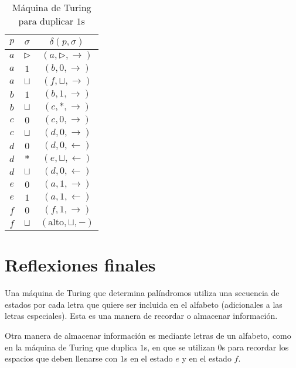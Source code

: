 \documentclass[paper=leter, fontsize=11pt]{scrartcl}
\numberwithin{equation}{section}		%
\numberwithin{figure}{section}			%
\numberwithin{table}{section}				%
\begin{document}
\begin{table}[]
	\caption{Máquina de Turing para duplicar $1$s}
	\label{duplicar}
	\centering
	\begin{tabular}{cc|c}
	$p$ & $\sigma$ & $\delta(p, \sigma)$ \\ \hline

	$a$ & $\triangleright$ & $(a, \triangleright, \rightarrow)$ \\
	$a$ & $1$ & $(b, 0, \rightarrow)$ \\
	$a$ & $\sqcup$ & $(f, \sqcup, \rightarrow)$ \\
	$b$ & $1$ & $(b, 1, \rightarrow)$ \\
	$b$ & $\sqcup$ & $(c, *, \rightarrow)$ \\
	$c$ & $0$ & $(c, 0, \rightarrow)$ \\
	$c$ & $\sqcup$ & $(d, 0, \rightarrow)$ \\
	$d$ & $0$ & $(d, 0, \leftarrow)$ \\
	$d$ & $*$ & $(e, \sqcup, \leftarrow)$ \\
	$d$ & $\sqcup$ & $(d, 0, \leftarrow)$ \\
	$e$ & $0$ & $(a, 1, \rightarrow)$ \\
	$e$ & $1$ & $(a, 1, \leftarrow)$ \\
	$f$ & $0$ & $(f, 1, \rightarrow)$ \\
	$f$ & $\sqcup$ & $(\text{alto}, \sqcup, -)$
	\end{tabular}
\end{table}

\section{Reflexiones finales}
Una máquina de Turing que determina palíndromos utiliza una secuencia de estados por cada letra que quiere ser incluida en el alfabeto (adicionales a las letras especiales). Esta es una manera de recordar o almacenar información. 

Otra manera de almacenar información es mediante letras de un alfabeto, como en la máquina de Turing que duplica $1$s, en que se utilizan $0$s para recordar los espacios que deben llenarse con $1$s en el estado $e$ y en el estado $f$.



\end{document}
